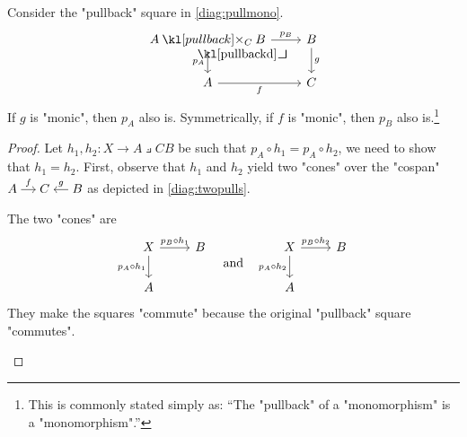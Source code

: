 \documentclass[main.tex]{subfiles}
\begin{document}
\begin{thm}\label{thm:pullmono}
    Consider the "pullback" square in \eqref{diag:pullmono}.
    \begin{equation}\label{diag:pullmono}
        \begin{tikzcd}
            A \pullback{C} B \arrow[r, "p_B"] \arrow[d, "p_A"'] \arrow[dr, phantom, "\pullbackd", very near start] & B \arrow[d, "g"] \\
            A \arrow[r, "f"'] & C 
        \end{tikzcd}
    \end{equation}
    If $g$ is "monic", then $p_A$ also is. Symmetrically, if $f$ is "monic", then $p_B$ also is.\footnote{This is commonly stated simply as: ``The "pullback" of a "monomorphism" is a "monomorphism".''}
\end{thm}
\begin{proof}
    Let $h_1, h_2: X \rightarrow A \pullback{C} B$ be such that $p_A \circ h_1 = p_A \circ h_2$, we need to show that $h_1 = h_2$. First, observe that $h_1$ and $h_2$ yield two "cones" over the "cospan" $\begin{tikzcd}[cramped, sep=small] A \arrow[r, "f"] & C & B \arrow[l, "g"'] \end{tikzcd}$ as depicted in \eqref{diag:twopulls}.\begin{marginfigure}[2\baselineskip]The two "cones" are \[\begin{tikzcd}
        X & B \\
        A
        \arrow["{p_A \circ h_1}"', from=1-1, to=2-1]
        \arrow["{p_B \circ h_1}", from=1-1, to=1-2]
    \end{tikzcd}\quad \text{and} \quad \begin{tikzcd}
        X & B \\
        A
        \arrow["{p_A \circ h_2}"', from=1-1, to=2-1]
        \arrow["{p_B \circ h_2}", from=1-1, to=1-2]
    \end{tikzcd}\]They make the squares "commute" because the original "pullback" square "commutes".\end{marginfigure}
    \begin{equation}\label{diag:twopulls}

\end{equation}
\end{proof}
\end{document}
